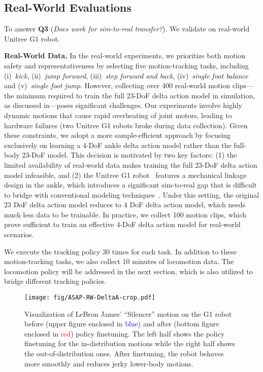 \subsection{Real-World Evaluations}
\label{sec:real-exp}
To answer \textbf{Q3} (\textit{Does \method work for sim-to-real transfer?}). We validate \method on real-world Unitree G1 robot.

\textbf{Real-World Data.}
\label{subsec:real-world-data}In the real-world experiments, we prioritize both motion safety and representativeness by selecting five motion-tracking tasks, including (i)~\textit{kick}, (ii)~\textit{jump forward}, (iii)~\textit{step forward and back}, (iv)~\textit{single foot balance} and (v)~\textit{single foot jump}. 
However, collecting over 400 real-world motion clips— the minimum required to train the full 23-DoF delta action model in simulation, as discussed in—poses significant challenges. Our experiments involve highly dynamic motions that cause rapid overheating of joint motors, leading to hardware failures (two Unitree G1 robots broke during data collection). 
Given these constraints, we adopt a more sample-efficient approach by focusing exclusively on learning a 4-DoF ankle delta action model rather than the full-body 23-DoF model. This decision is motivated by two key factors: (1) the limited availability of real-world data makes training the full 23-DoF delta action model infeasible, and (2) the Unitree G1 robot~\cite{Unitree2024G1} features a mechanical linkage design in the ankle, which introduces a significant sim-to-real gap that is difficult to bridge with conventional modeling techniques~\cite{KimJLALS20}.
Under this setting, the original 23 DoF delta action model reduces to 4 DoF delta action model, which needs much less data to be trainable. In practice, we collect 100 motion clips, which prove sufficient to train an effective 4-DoF delta action model for real-world scenarios.

We execute the tracking policy 30 times for each task. In addition to these motion-tracking tasks, we also collect 10 minutes of locomotion data. The locomotion policy will be addressed in the next section, which is also utilized to bridge different tracking policies.

\begin{figure*}[t]
    \centering
    \texttt{[image: fig/ASAP-RW-DeltaA-crop.pdf]}
    \caption{Visualization of LeBron James’ ``Silencer'' motion on the G1 robot before (upper figure enclosed in \textcolor{blue}{blue}) and after (bottom figure enclosed in \textcolor{red}{red}) \method policy finetuning. The left half shows the policy finetuning for the in-distribution motions while the right half shows the out-of-distribution ones. After \method finetuning, the robot behaves more smoothly and reduces jerky lower-body motions.}
    \label{fig:ASAP_real_compare}

\end{figure*}


